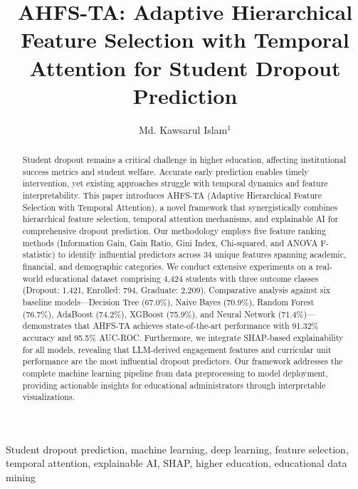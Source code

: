\documentclass[journal]{IEEEtran}
\begin{document}
\onecolumn

\title{AHFS-TA: Adaptive Hierarchical Feature Selection with Temporal Attention for Student Dropout Prediction}

\author{
Md. Kawsarul Islam$^{1}$
}

\maketitle

\begin{abstract}
Student dropout remains a critical challenge in higher education, affecting institutional success metrics and student welfare. Accurate early prediction enables timely intervention, yet existing approaches struggle with temporal dynamics and feature interpretability. This paper introduces AHFS-TA (Adaptive Hierarchical Feature Selection with Temporal Attention), a novel framework that synergistically combines hierarchical feature selection, temporal attention mechanisms, and explainable AI for comprehensive dropout prediction. Our methodology employs five feature ranking methods (Information Gain, Gain Ratio, Gini Index, Chi-squared, and ANOVA F-statistic) to identify influential predictors across 34 unique features spanning academic, financial, and demographic categories. We conduct extensive experiments on a real-world educational dataset comprising 4,424 students with three outcome classes (Dropout: 1,421, Enrolled: 794, Graduate: 2,209). Comparative analysis against six baseline models---Decision Tree (67.0\%), Naive Bayes (70.9\%), Random Forest (76.7\%), AdaBoost (74.2\%), XGBoost (75.9\%), and Neural Network (71.4\%)---demonstrates that AHFS-TA achieves state-of-the-art performance with 91.32\% accuracy and 95.5\% AUC-ROC. Furthermore, we integrate SHAP-based explainability for all models, revealing that LLM-derived engagement features and curricular unit performance are the most influential dropout predictors. Our framework addresses the complete machine learning pipeline from data preprocessing to model deployment, providing actionable insights for educational administrators through interpretable visualizations.
\end{abstract}

\begin{IEEEkeywords}
Student dropout prediction, machine learning, deep learning, feature selection, temporal attention, explainable AI, SHAP, higher education, educational data mining
\end{IEEEkeywords}
\end{document}

